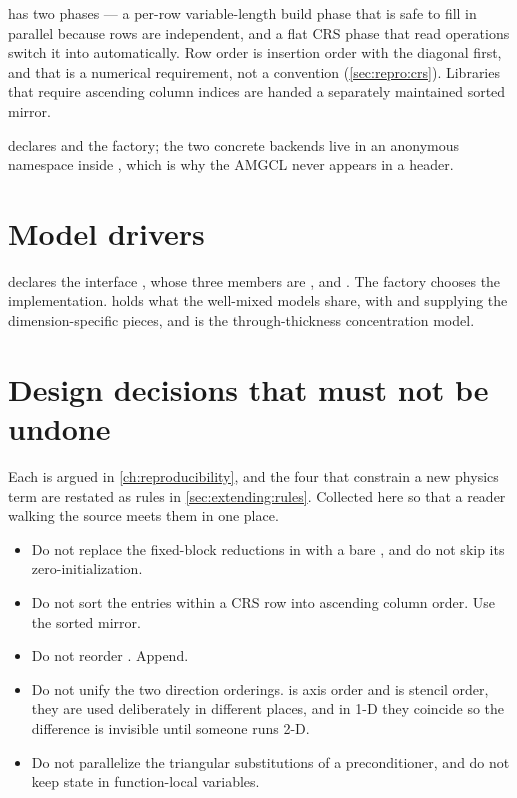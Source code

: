  has two phases --- a per-row variable-length build phase
that is safe to fill in parallel because rows are independent, and a flat CRS
phase that read operations switch it into automatically. Row order is insertion
order with the diagonal first, and that is a numerical requirement, not a
convention (\cref{sec:repro:crs}). Libraries that require ascending column
indices are handed a separately maintained sorted mirror.

 declares  and the
factory; the two concrete backends live in an anonymous namespace inside
, which is why the AMGCL  never
appears in a header.

\section{Model drivers}
\label{sec:layout:models}

 declares the interface ,
whose three members are ,  and . The factory
 chooses the implementation.  holds what the
well-mixed models share, with  and  supplying the
dimension-specific pieces, and  is the through-thickness
concentration model.

\section{Design decisions that must not be undone}
\label{sec:layout:donottouch}

Each is argued in \cref{ch:reproducibility}, and the four that constrain a new
physics term are restated as rules in \cref{sec:extending:rules}. Collected
here so that a reader walking the source meets them in one place.

\begin{warn}
\begin{itemize}
  \item Do not replace the fixed-block reductions in  with a bare
    , and do not skip its zero-initialization.
  \item Do not sort the entries within a CRS row into ascending column order.
    Use the sorted mirror.
  \item Do not reorder . Append.
  \item Do not unify the two direction orderings.  is axis order
    and  is stencil order, they are used deliberately in
    different places, and in 1-D they coincide so the difference is invisible
    until someone runs 2-D.
  \item Do not parallelize the triangular substitutions of a preconditioner,
    and do not keep state in function-local  variables.
\end{itemize}
\end{warn}

